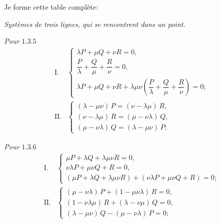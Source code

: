 \documentclass[11pt,a4paper]{book}
\begin{document}
Je forme cette table compl\`ete:

\begin{center}\textit{Syst\`emes de trois lignes, qui se rencontrent dans un point.}\end{center}

\textit{Pour} $1.3.5$
\[
\begin{array}{ll}
\text{I.} & \begin{cases}
\lambda P + \mu Q + \nu R = 0, \\[2pt]
\dfrac{P}{\lambda} + \dfrac{Q}{\mu} + \dfrac{R}{\nu} = 0, \\[6pt]
\lambda P + \mu Q + \nu R + \lambda\mu\nu \left(\dfrac{P}{\lambda} + \dfrac{Q}{\mu} + \dfrac{R}{\nu}\right) = 0;
\end{cases} \\[18pt]
\text{II.} & \begin{cases}
(\lambda - \mu\nu)\, P = (\nu - \lambda\mu)\, R, \\[2pt]
(\nu - \lambda\mu)\, R = (\mu - \nu\lambda)\, Q, \\[2pt]
(\mu - \nu\lambda)\, Q = (\lambda - \mu\nu)\, P;
\end{cases}
\end{array}
\]

\textit{Pour} $1.3.6$
\[
\begin{array}{ll}
\text{I.} & \begin{cases}
\mu P + \lambda Q + \lambda\mu\nu R = 0, \\[2pt]
\nu\lambda P + \mu\nu Q + R = 0, \\[2pt]
(\mu P + \lambda Q + \lambda\mu\nu R) + (\nu\lambda P + \mu\nu Q + R) = 0;
\end{cases} \\[18pt]
\text{II.} & \begin{cases}
(\mu - \nu\lambda)\, P + (1 - \mu\nu\lambda)\, R = 0, \\[2pt]
(1 - \nu\lambda\mu)\, R + (\lambda - \nu\mu)\, Q = 0, \\[2pt]
(\lambda - \mu\nu)\, Q - (\mu - \nu\lambda)\, P = 0;
\end{cases}
\end{array}
\]
\end{document}

